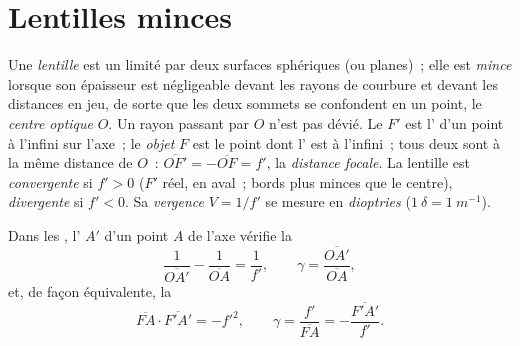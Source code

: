 \section{Lentilles minces}

\begin{definition}\label{def:b1:mirrors-thin-lenses:lens}
Une \emph{lentille} est un  limité par deux surfaces
sphériques (ou planes)~; elle est \emph{mince} lorsque son épaisseur est
négligeable devant les rayons de courbure et devant les distances en
jeu, de sorte que les deux sommets se confondent en un point, le
\emph{centre optique} $O$. Un rayon passant par $O$ n'est pas dévié. Le
\emph{ } $F'$ est l' d'un point à l'infini sur l'axe~; le
\emph{ objet} $F$ est le point dont l' est à l'infini~; tous
deux sont à la même distance de $O$~:
$\overline{OF'} = -\overline{OF} = f'$, la \emph{distance focale}. La
lentille est \emph{convergente} si $f' > 0$ ($F'$ réel, en aval~; bords
plus minces que le centre), \emph{divergente} si $f' < 0$. Sa
\emph{vergence} $V = 1/f'$ se mesure en \emph{dioptries}
($\qty{1}{\delta} = \qty{1}{m^{-1}}$).
\end{definition}

\begin{theorem}\label{thm:b1:mirrors-thin-lenses:lensconj}
Dans les , l' $A'$ d'un point $A$ de l'axe
vérifie la 
\[
\frac{1}{\overline{OA'}} - \frac{1}{\overline{OA}} = \frac{1}{f'},
\qquad
\gamma = \frac{\overline{OA'}}{\overline{OA}},
\]
et, de façon équivalente, la 
\[
\overline{FA}\cdot\overline{F'A'} = -f'^2,
\qquad
\gamma = \frac{f'}{\overline{FA}} = -\frac{\overline{F'A'}}{f'} .
\]
\end{theorem}

